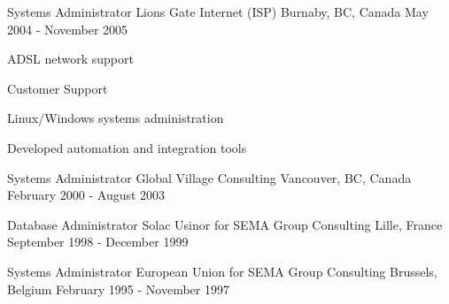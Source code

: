 \begin{cventries}
  \cventry
    {Systems Administrator} %
    {Lions Gate Internet (ISP)} %
    {Burnaby, BC, Canada} %
    {May 2004 - November 2005} %
    {
      \begin{cvitems} %
        \item {ADSL network support}
        \item {Customer Support}
        \item {Linux/Windows systems administration}
        \item {Developed automation and integration tools}
      \end{cvitems}
    }

  \cventry
    {Systems Administrator} %
    {Global Village Consulting} %
    {Vancouver, BC, Canada} %
    {February 2000 - August 2003} %
    {
      \begin{cvitems} %
      \end{cvitems}
    }

\cventry
{Database Administrator} %
{Solac Usinor for SEMA Group Consulting} %
{Lille, France} %
{September 1998 - December 1999} %
{
  \begin{cvitems} %
  \end{cvitems}
}


\cventry
{Systems Administrator} %
{European Union for SEMA Group Consulting} %
{Brussels, Belgium} %
{February 1995 - November 1997} %
{
  \begin{cvitems} %
  \end{cvitems}
}
\end{cventries}
